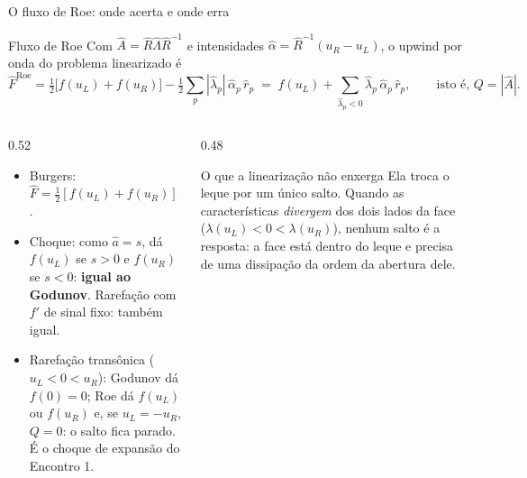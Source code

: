 \documentclass[aspectratio=169,10pt]{beamer}
\newcommand{\Fh}{\widehat F}
\newcommand{\Ah}{\widehat A}
\newcommand{\lh}{\hat\lambda}
\newcommand{\ah}{\hat\alpha}
\newcommand{\rh}{\hat r}
\begin{document}
\begin{frame}{O fluxo de Roe: onde acerta e onde erra}
\begin{definicao}{Fluxo de Roe}
Com $\Ah=\hat R\hat\Lambda\hat R^{-1}$ e intensidades $\ah=\hat R^{-1}(u_R-u_L)$, o upwind por onda do problema linearizado é
\[
\Fh^{\mathrm{Roe}}=\tfrac12\big[f(u_L)+f(u_R)\big]-\tfrac12\sum_{p}|\lh_p|\,\ah_p\,\rh_p
\;=\;f(u_L)+\sum_{\lh_p<0}\lh_p\,\ah_p\,\rh_p ,\qquad\text{isto é, } Q=|\Ah|.
\]
\end{definicao}
\begin{columns}[T]
\begin{column}{0.52\textwidth}
\begin{itemize}
\item Burgers: $\Fh=\frac12[f(u_L)+f(u_R)]-\frac12\big|\frac{u_L+u_R}{2}\big|(u_R-u_L)$.
\item Choque: como $\hat a=s$, dá $f(u_L)$ se $s>0$ e $f(u_R)$ se $s<0$: \textbf{igual ao Godunov}. Rarefação com $f'$ de sinal fixo: também igual.
\item Rarefação transônica ($u_L<0<u_R$): Godunov dá $f(0)=0$; Roe dá $f(u_L)$ ou $f(u_R)$ e, se $u_L=-u_R$, $Q=0$: o salto fica parado. É o choque de expansão do Encontro 1.
\end{itemize}
\end{column}
\begin{column}{0.48\textwidth}
\begin{atencao}{O que a linearização não enxerga}
Ela troca o leque por um único salto. Quando as características \emph{divergem} dos dois lados da face ($\lambda(u_L)<0<\lambda(u_R)$), nenhum salto é a resposta: a face está dentro do leque e precisa de uma dissipação da ordem da abertura dele.
\end{atencao}
\end{column}
\end{columns}
\end{frame}
\end{document}

